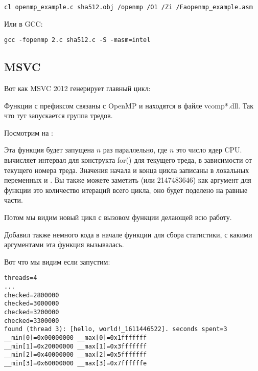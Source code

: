 \begin{lstlisting}
cl openmp_example.c sha512.obj /openmp /O1 /Zi /Faopenmp_example.asm
\end{lstlisting}

Или в GCC:

\begin{lstlisting}
gcc -fopenmp 2.c sha512.c -S -masm=intel
\end{lstlisting}

\subsection{MSVC}

Вот как MSVC 2012 генерирует главный цикл:



Функции с префиксом  связаны с OpenMP и находятся в файле vcomp*.dll.
Так что тут запускается группа тредов.

Посмотрим на :



Эта функция будет запущена $n$ раз параллельно, где $n$ это число ядер \ac{CPU}.\\
 вычисляет интервал для конструкта
for() для текущего треда, в зависимости от текущего номера треда.
Значения начала и конца цикла записаны в локальных переменных  и .
Вы также можете заметить  (или 2147483646) как аргумент для функции 
это количество итераций всего цикла, оно будет поделено на равные части.

Потом мы видим новый цикл с вызовом функции  делающей всю работу.

Добавил также немного кода в начале функции  для сбора статистики,
с какими аргументами эта функция вызывалась.

Вот что мы видим если запустим:

\begin{lstlisting}
threads=4
...
checked=2800000
checked=3000000
checked=3200000
checked=3300000
found (thread 3): [hello, world!_1611446522]. seconds spent=3
__min[0]=0x00000000 __max[0]=0x1fffffff
__min[1]=0x20000000 __max[1]=0x3fffffff
__min[2]=0x40000000 __max[2]=0x5fffffff
__min[3]=0x60000000 __max[3]=0x7ffffffe
\end{lstlisting}

